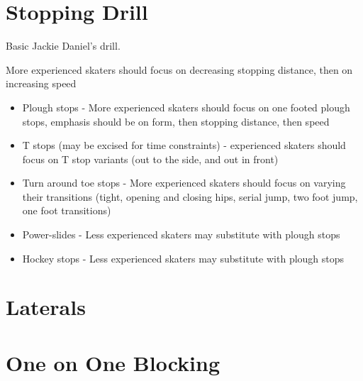 \documentclass{journal}
\begin{document}
\section*{Stopping Drill}
\label{drill:stopping:jackie_daniels}
Basic Jackie Daniel's drill.

More experienced skaters should focus on decreasing stopping distance, then on increasing speed

\begin{itemize}
    \item Plough stops - More experienced skaters should focus on one footed plough stops, emphasis should be on form, then stopping distance, then speed 
    \item T stops (may be excised for time constraints) - experienced skaters should focus on T stop variants (out to the side, and out in front)  
    \item Turn around toe stops - More experienced skaters should focus on varying their transitions (tight, opening and closing hips, serial jump, two foot jump, one foot transitions)    
    \item Power-slides - Less experienced skaters may substitute with plough stops
    \item Hockey stops - Less experienced skaters may substitute with plough stops
\end{itemize}


\section*{Laterals}







\section*{One on One Blocking}






\end{document}
